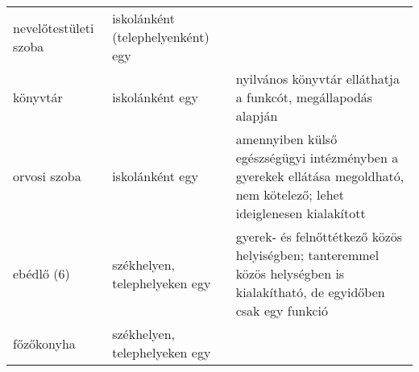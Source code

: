 \documentclass{article}
\begin{document}
\begin{longtable}[]{@{}lll@{}}
\begin{minipage}[t]{0.13\columnwidth}\raggedright
nevelőtestületi szoba\strut
\end{minipage} & \begin{minipage}[t]{0.26\columnwidth}\raggedright
iskolánként (telephelyenként) egy\strut
\end{minipage} & \begin{minipage}[t]{0.51\columnwidth}\raggedright
\strut
\end{minipage}\tabularnewline
\begin{minipage}[t]{0.13\columnwidth}\raggedright
könyvtár\strut
\end{minipage} & \begin{minipage}[t]{0.26\columnwidth}\raggedright
iskolánként egy\strut
\end{minipage} & \begin{minipage}[t]{0.51\columnwidth}\raggedright
nyilvános könyvtár elláthatja a funkcót, megállapodás alapján\strut
\end{minipage}\tabularnewline
\begin{minipage}[t]{0.13\columnwidth}\raggedright
orvosi szoba\strut
\end{minipage} & \begin{minipage}[t]{0.26\columnwidth}\raggedright
iskolánként egy\strut
\end{minipage} & \begin{minipage}[t]{0.51\columnwidth}\raggedright
amennyiben külső egészségügyi intézményben a gyerekek ellátása
megoldható, nem kötelező; lehet ideiglenesen kialakított\strut
\end{minipage}\tabularnewline
\begin{minipage}[t]{0.13\columnwidth}\raggedright
ebédlő (6)\strut
\end{minipage} & \begin{minipage}[t]{0.26\columnwidth}\raggedright
székhelyen, telephelyeken egy\strut
\end{minipage} & \begin{minipage}[t]{0.51\columnwidth}\raggedright
gyerek- és felnőttétkező közös helyiségben; tanteremmel közös helységben
is kialakítható, de egyidőben csak egy funkció\strut
\end{minipage}\tabularnewline
\begin{minipage}[t]{0.13\columnwidth}\raggedright
főzőkonyha\strut
\end{minipage} & \begin{minipage}[t]{0.26\columnwidth}\raggedright
székhelyen, telephelyeken egy\strut

\end{minipage}
\end{longtable}
\end{document}
